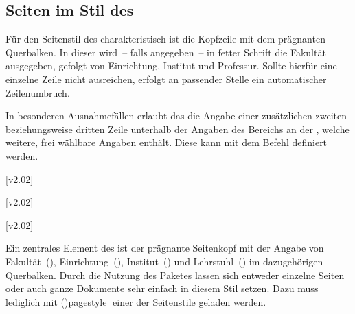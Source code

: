 \begin{DeclareEntity*}{}
\begin{DeclareEntity*}{}
\begin{DeclareEntity*}{}
\subsection{%
  Seiten im Stil des \CDs%
  \label{sec:tudheadings}%
}

\begin{Declaration}
  {}
\begin{Declaration}
  {}
\begin{Declaration}
  {}
\begin{Declaration}
  {}
\begin{Declaration}
  {}

Für den Seitenstil des \TUDCDs charakteristisch ist die Kopfzeile mit dem 
prägnanten Querbalken. In dieser wird~-- falls angegeben~-- in fetter Schrift 
die Fakultät ausgegeben, gefolgt von Einrichtung, Institut und Professur. 
Sollte hierfür eine einzelne Zeile nicht ausreichen, erfolgt an passender 
Stelle ein automatischer Zeilenumbruch.

In besonderen Ausnahmefällen erlaubt das \CD die Angabe einer zusätzlichen
zweiten beziehungsweise dritten Zeile unterhalb der Angaben des Bereichs an der 
\TnUD, welche weitere, frei wählbare Angaben enthält. Diese kann mit dem Befehl 
 definiert werden.
\end{Declaration}
\end{Declaration}
\end{Declaration}
\end{Declaration}
\end{Declaration}
%
\begin{Declaration}
  {}
  [v2.02]
\begin{Declaration}
  {}
  [v2.02]
\begin{Declaration}
  {}
  [v2.02]

Ein zentrales Element des \TUDCDs ist der prägnante Seitenkopf mit der Angabe 
von Fakultät~(), Einrichtung~(), 
Institut~() und Lehrstuhl~() im dazugehörigen 
Querbalken. Durch die Nutzung des Paketes  lassen 
sich entweder einzelne Seiten oder auch ganze Dokumente sehr einfach in diesem 
Stil setzen. Dazu muss lediglich mit 
\Macro(){pagestyle|} 
einer der Seitenstile geladen werden. 


\end{Declaration}
\end{Declaration}
\end{Declaration}
\end{DeclareEntity*}
\end{DeclareEntity*}
\end{DeclareEntity*}
